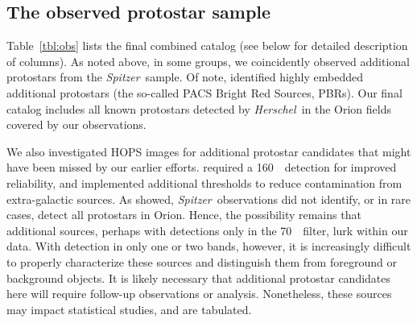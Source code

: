 \documentclass[manuscript]{aastex61}
\newcommand{\herschel}{{\em Herschel}}
\newcommand{\spitzer}{{\em Spitzer}}
\begin{document}
\subsection{The observed protostar sample}
\label{sec:protostars}
Table~\ref{tbl:obs} lists the final combined catalog (see below for detailed description of columns).  As noted above, in some groups, we coincidently observed additional protostars from the \citet{orion} \spitzer\ sample.  Of note, \citet{pbrpaper} identified highly embedded additional protostars (the so-called PACS Bright Red Sources, PBRs).  Our final catalog includes all known protostars detected by \herschel\ in the Orion fields covered by our observations.
\par
We also investigated HOPS images for additional protostar candidates that might have been missed by our earlier efforts.  \citet{pbrpaper} required a 160~\micron\ detection for improved reliability, and implemented additional thresholds to reduce contamination from extra-galactic sources.  As \citet{pbrpaper} showed, \spitzer\ observations did not identify, or in rare cases, detect all protostars in Orion.  Hence, the possibility remains that additional sources, perhaps with detections only in the 70~\micron\ filter, lurk within our data.  With detection in only one or two bands, however, it is increasingly difficult to properly characterize these sources and distinguish them from foreground or background objects.  It is likely necessary that additional protostar candidates here will require follow-up observations or analysis.  Nonetheless, these sources may impact statistical studies, and are tabulated.
\par
\end{document}
